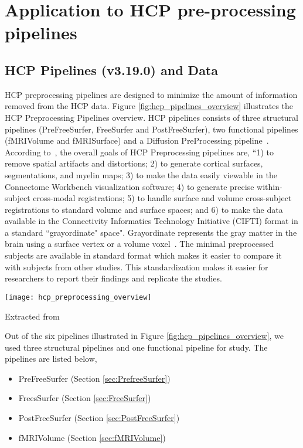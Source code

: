 \chapter{Application to HCP pre-processing pipelines}

\section{HCP Pipelines (v3.19.0) and Data}
HCP preprocessing pipelines are designed to minimize the amount of information removed from the HCP data. Figure \ref{fig:hcp_pipelines_overview} illustrates the HCP Preprocessing Pipelines overview. HCP pipelines consists of three structural pipelines (PreFreeSurfer, FreeSurfer and PostFreeSurfer), two functional pipelines (fMRIVolume and fMRISurface) and a Diffusion PreProcessing pipeline~\cite{Gla13}. According to~\cite{Gla13}, the overall goals of HCP Preprocessing pipelines are, ``1) to remove spatial artifacts and distortions; 2) to generate cortical surfaces, segmentations, and myelin maps; 3) to make the data easily viewable in the Connectome Workbench visualization software; 4) to generate precise within-subject cross-modal registrations; 5) to handle surface and volume cross-subject registrations to standard volume and surface spaces; and 6) to make the data available in the Connectivity Informatics Technology Initiative (CIFTI) format in a standard ``grayordinate" space". Grayordinate represents the gray matter in the brain using a surface vertex or a volume voxel~\cite{Grayordinate}. The minimal preprocessed subjects are available in standard format which makes it easier to compare it with subjects from other studies. This standardization makes it easier for researchers to report their findings and replicate the studies.

\begin{center}
   \texttt{[image: hcp\_preprocessing\_overview]}
   \label{fig:hcp_pipelines_overview}
   \caption*{Extracted from \cite{Gla13}}
\end{center}

Out of the six pipelines illustrated in Figure \ref{fig:hcp_pipelines_overview}, we used three structural pipelines and one functional pipeline for study. The pipelines are listed below, 
\begin{itemize}
  \item PreFreeSurfer (Section \ref{sec:PrefreeSurfer})
  \item FreesSurfer   (Section \ref{sec:FreeSurfer})
  \item PostFreeSurfer (Section \ref{sec:PostFreeSurfer})
  \item fMRIVolume    (Section \ref{sec:fMRIVolume})
\end{itemize}

